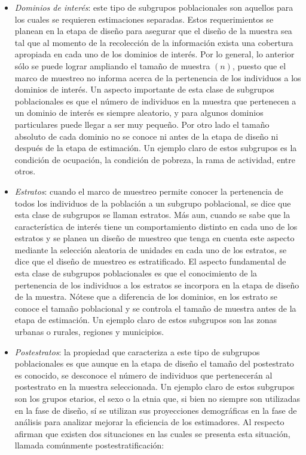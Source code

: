 \documentclass[
  12pt,
]{book}
\begin{document}
\begin{itemize}
\item
  \emph{Dominios de interés}: este tipo de subgrupos poblacionales son aquellos para los cuales se requieren estimaciones separadas. Estos requerimientos se planean en la etapa de diseño para asegurar que el diseño de la muestra sea tal que al momento de la recolección de la información exista una cobertura apropiada en cada uno de los dominios de interés. Por lo general, lo anterior sólo se puede lograr ampliando el tamaño de muestra \((n)\), puesto que el marco de muestreo no informa acerca de la pertenencia de los individuos a los dominios de interés. Un aspecto importante de esta clase de subgrupos poblacionales es que el número de individuos en la muestra que pertenecen a un dominio de interés es siempre aleatorio, y para algunos dominios particulares puede llegar a ser muy pequeño. Por otro lado el tamaño absoluto de cada dominio no se conoce ni antes de la etapa de diseño ni después de la etapa de estimación. Un ejemplo claro de estos subgrupos es la condición de ocupación, la condición de pobreza, la rama de actividad, entre otros.
\item
  \emph{Estratos}: cuando el marco de muestreo permite conocer la pertenencia de todos los individuos de la población a un subgrupo poblacional, se dice que esta clase de subgrupos se llaman estratos. Más aun, cuando se sabe que la característica de interés tiene un comportamiento distinto en cada uno de los estratos y se planea un diseño de muestreo que tenga en cuenta este aspecto mediante la selección aleatoria de unidades en cada uno de los estratos, se dice que el diseño de muestreo es estratificado. El aspecto fundamental de esta clase de subgrupos poblacionales es que el conocimiento de la pertenencia de los individuos a los estratos se incorpora en la etapa de diseño de la muestra. Nótese que a diferencia de los dominios, en los estrato se conoce el tamaño poblacional y se controla el tamaño de muestra antes de la etapa de estimación. Un ejemplo claro de estos subgrupos son las zonas urbanas o rurales, regiones y municipios.
\item
  \emph{Postestratos}: la propiedad que caracteriza a este tipo de subgrupos poblacionales es que aunque en la etapa de diseño el tamaño del postestrato es conocido, se desconoce el número de individuos que pertenecerán al postestrato en la muestra seleccionada. Un ejemplo claro de estos subgrupos son los grupos etarios, el sexo o la etnia que, si bien no siempre son utilizadas en la fase de diseño, sí se utilizan sus proyecciones demográficas en la fase de análisis para analizar mejorar la eficiencia de los estimadores. Al respecto \citet{Sarndal_Swensson_Wretman_2003} afirman que existen dos situaciones en las cuales se presenta esta situación, llamada comúnmente postestratificación:


\end{itemize}
\end{document}

